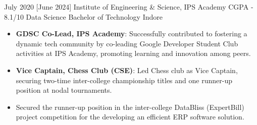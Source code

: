 \documentclass{resume}
\begin{document}
\begin{educations}
  \education%
    {July 2020}%
    [June 2024]%
    {Institute of Engineering \& Science, IPS Academy}%
    {CGPA - 8.1/10}%
    {Data Science}%
    {Bachelor of Technology}
    {Indore}
\end{educations}

\begin{itemize}
  \item \textbf{GDSC Co-Lead, IPS Academy}: Successfully contributed to fostering a dynamic tech community by co-leading Google Developer Student Club activities at IPS Academy, promoting learning and innovation among peers.
  \item \textbf{Vice Captain, Chess Club (CSE)}: Led Chess club as Vice Captain, securing two-time inter-college championship titles and one runner-up position at nodal tournaments.
  \item Secured the runner-up position in the inter-college DataBliss (ExpertBill) project competition for the developing an efficient ERP software solution.

\end{itemize}
\end{document}

